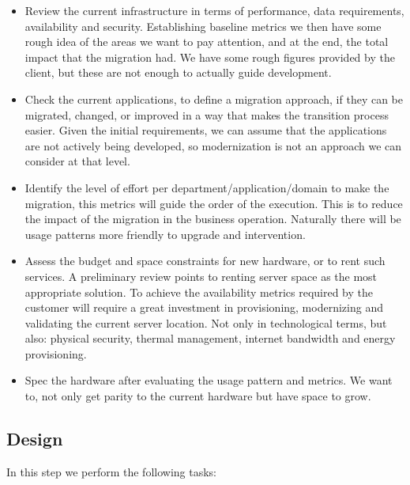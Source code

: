 \documentclass{llncs}
\begin{document}
\begin{itemize}

  \item Review the current infrastructure in terms of performance, data requirements, availability and security. Establishing baseline metrics we then have some rough idea of the areas we want to pay attention, and  at the end, the total impact that the migration had. We have some rough figures provided by the client, but these are not enough to actually guide development.
  \item Check the current applications, to define a migration approach, if they can be migrated, changed, or improved in a way that makes the transition process easier. Given the initial requirements, we can assume that the applications are not actively being developed, so modernization is not an approach we can consider at that level.
  \item Identify the level of effort per department/application/domain to make the migration, this metrics will guide the order of the execution. This is to reduce the impact of the migration in the business operation. Naturally there will be usage patterns more friendly to upgrade and intervention.
  \item Assess the budget and space constraints for new hardware, or to rent such services. A preliminary review points to renting server space as the most appropriate solution. To achieve the availability metrics required by the customer will require a great investment in provisioning, modernizing and validating the current server location. Not only in technological terms, but also: physical security, thermal management, internet bandwidth and energy provisioning.
  \item Spec the hardware after evaluating the usage pattern and metrics. We want to, not only get parity to the current hardware but have space to grow.
\end{itemize}

\subsection{Design}

In this step we perform the following tasks:
\end{document}
